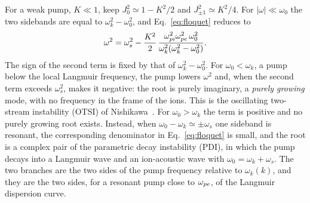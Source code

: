 For a weak pump, $K\ll1$, keep $J_0^2\simeq1-K^2/2$ and $J_{\pm1}^2\simeq K^2/4$. For $|\omega|\ll\omega_0$ the two sidebands are equal to $\omega_k^2-\omega_0^2$, and Eq.~\eqref{eq:floquet} reduces to
\begin{equation}
\omega^2=\omega_s^2-\frac{K^2}{2}\,\frac{\omega_{pi}^2\omega_{pe}^2\,\omega_0^2}{\omega_k^2(\omega_k^2-\omega_0^2)} .\label{eq:otsi}
\end{equation}
The sign of the second term is fixed by that of $\omega_k^2-\omega_0^2$. For $\omega_0<\omega_k$, a pump below the local Langmuir frequency, the pump lowers $\omega^2$ and, when the second term exceeds $\omega_s^2$, makes it negative: the root is purely imaginary, a \emph{purely growing} mode, with no frequency in the frame of the ions. This is the oscillating two-stream instability (OTSI) of Nishikawa~\citep{Nishikawa1968a}. For $\omega_0>\omega_k$ the term is positive and no purely growing root exists. Instead, when $\omega_0-\omega_k\simeq\pm\omega_s$ one sideband is resonant, the corresponding denominator in Eq.~\eqref{eq:floquet} is small, and the root is a complex pair of the parametric decay instability (PDI), in which the pump decays into a Langmuir wave and an ion-acoustic wave with $\omega_0=\omega_k+\omega_s$. The two branches are the two sides of the pump frequency relative to $\omega_k(k)$, and they are the two sides, for a resonant pump close to $\omega_{pe}$, of the Langmuir dispersion curve.

